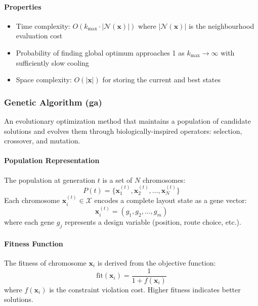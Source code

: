 \paragraph{Properties}
\begin{itemize}
\item Time complexity: $O(k_{\max} \cdot |\mathcal{N}(\mathbf{x})|)$ where $|\mathcal{N}(\mathbf{x})|$ is the neighbourhood evaluation cost
\item Probability of finding global optimum approaches 1 as $k_{\max} \rightarrow \infty$ with sufficiently slow cooling
\item Space complexity: $O(|\mathbf{x}|)$ for storing the current and best states
\end{itemize}

\subsubsection{Genetic Algorithm (ga)}
An evolutionary optimization method that maintains a population of candidate solutions and evolves them through biologically-inspired operators: selection, crossover, and mutation.

\paragraph{Population Representation}
The population at generation $t$ is a set of $N$ chromosomes:
\begin{equation}
P(t) = \{\mathbf{x}_1^{(t)}, \mathbf{x}_2^{(t)}, \ldots, \mathbf{x}_N^{(t)}\}
\end{equation}
Each chromosome $\mathbf{x}_i^{(t)} \in \mathcal{X}$ encodes a complete layout state as a gene vector:
\begin{equation}
\mathbf{x}_i^{(t)} = (g_1, g_2, \ldots, g_m)
\end{equation}
where each gene $g_j$ represents a design variable (position, route choice, etc.).

\paragraph{Fitness Function}
The fitness of chromosome $\mathbf{x}_i$ is derived from the objective function:
\begin{equation}
\text{fit}(\mathbf{x}_i) = \frac{1}{1 + f(\mathbf{x}_i)}
\end{equation}
where $f(\mathbf{x}_i)$ is the constraint violation cost. Higher fitness indicates better solutions.

